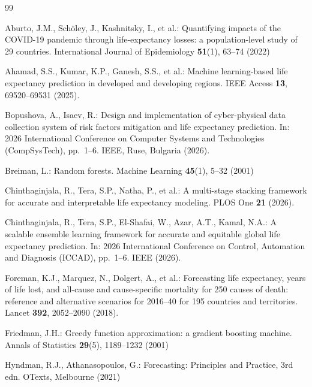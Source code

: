 \documentclass[runningheads]{llncs}
\begin{document}
\begin{thebibliography}{99}

Aburto, J.M., Schöley, J., Kashnitsky, I., et al.: Quantifying impacts of the COVID-19 pandemic
through life-expectancy losses: a population-level study of 29 countries. International Journal of
Epidemiology \textbf{51}(1), 63--74 (2022)

Ahamad, S.S., Kumar, K.P., Ganesh, S.S., et al.: Machine learning-based life expectancy prediction
in developed and developing regions. IEEE Access \textbf{13}, 69520--69531 (2025).

Bopushova, A., Isaev, R.: Design and implementation of cyber-physical data collection system of
risk factors mitigation and life expectancy prediction. In: 2026 International Conference on
Computer Systems and Technologies (CompSysTech), pp.~1--6. IEEE, Ruse, Bulgaria (2026).

Breiman, L.: Random forests. Machine Learning \textbf{45}(1), 5--32 (2001)

Chinthaginjala, R., Tera, S.P., Natha, P., et al.: A multi-stage stacking framework for accurate
and interpretable life expectancy modeling. PLOS One \textbf{21} (2026).

Chinthaginjala, R., Tera, S.P., El-Shafai, W., Azar, A.T., Kamal, N.A.: A scalable ensemble
learning framework for accurate and equitable global life expectancy prediction. In: 2026
International Conference on Control, Automation and Diagnosis (ICCAD), pp.~1--6. IEEE (2026).

Foreman, K.J., Marquez, N., Dolgert, A., et al.: Forecasting life expectancy, years of life lost,
and all-cause and cause-specific mortality for 250 causes of death: reference and alternative
scenarios for 2016--40 for 195 countries and territories. Lancet \textbf{392}, 2052--2090 (2018).

Friedman, J.H.: Greedy function approximation: a gradient boosting machine. Annals of Statistics
\textbf{29}(5), 1189--1232 (2001)

Hyndman, R.J., Athanasopoulos, G.: Forecasting: Principles and Practice, 3rd edn. OTexts,
Melbourne (2021)


\end{thebibliography}
\end{document}
